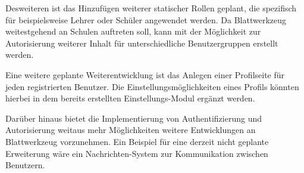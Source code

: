 Desweiteren ist das Hinzufügen weiterer statischer Rollen geplant, die spezifisch für beispielsweise Lehrer oder Schüler angewendet werden. Da Blattwerkzeug weitestgehend an Schulen auftreten soll, kann mit der Möglichkeit zur Autorisierung weiterer Inhalt für unterschiedliche Benutzergruppen erstellt werden.

Eine weitere geplante Weiterentwicklung ist das Anlegen einer Profilseite für jeden registrierten Benutzer. Die Einstellungsmöglichkeiten eines Profils könnten hierbei in dem bereits erstellten Einstellungs-Modul ergänzt werden. 

Darüber hinaus bietet die Implementierung von Authentifizierung und Autorisierung weitaus mehr Möglichkeiten weitere Entwicklungen an Blattwerkzeug vorzunehmen. Ein Beispiel für eine derzeit nicht geplante Erweiterung wäre ein Nachrichten-System zur Kommunikation zwischen Benutzern.


